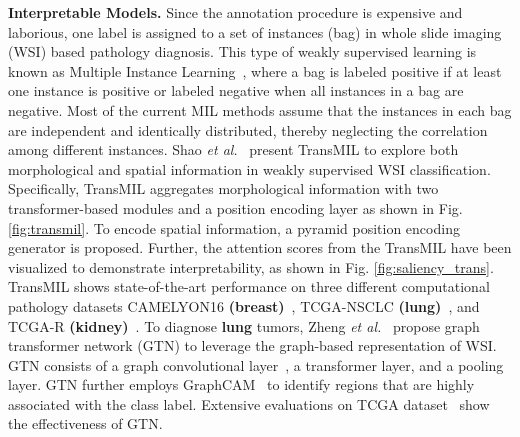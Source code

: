 \documentclass[10pt,journal,compsoc]{IEEEtran}
\begin{document}
 {{\textbf{Interpretable Models.}}} Since the annotation procedure is expensive and laborious, one label is assigned to a set of instances (bag) in whole slide imaging (WSI) based pathology diagnosis. This type of weakly supervised learning is known as Multiple Instance Learning~\cite{fung2007multiple}, where a bag is labeled positive if at least one instance is positive or labeled negative when all instances in a bag are negative. Most of the current MIL methods assume that the instances in each bag are independent and identically distributed, thereby neglecting the correlation among different instances. Shao \textit{et al.}~\cite{shao2021transmil} present TransMIL to explore both morphological and spatial information in weakly supervised WSI classification. Specifically, TransMIL aggregates morphological information with two transformer-based modules and a position encoding layer as shown in Fig. \ref{fig:transmil}. To encode spatial information, a pyramid position encoding generator is proposed. Further, the attention scores from the TransMIL have been visualized to demonstrate interpretability, as shown in Fig. \ref{fig:saliency_trans}. TransMIL shows state-of-the-art performance on three different computational pathology datasets CAMELYON16 \textbf{(breast)}~\cite{bejnordi2017diagnostic}, TCGA-NSCLC \textbf{(lung)}~\cite{napel2014nsclc}, and TCGA-R \textbf{(kidney)}~\cite{tcga}. %
To diagnose \textbf{lung} tumors, Zheng \textit{et al.}~\cite{zheng2021deep} propose graph transformer network (GTN) to leverage the graph-based representation of WSI. GTN consists of a graph convolutional layer~\cite{kipf2016semi}, a transformer layer, and a pooling layer. GTN further employs GraphCAM~\cite{chefer2021transformer} to identify regions that are highly associated with the class label. Extensive evaluations on TCGA dataset~\cite{napel2014nsclc} show the effectiveness of GTN.
 
\end{document}
